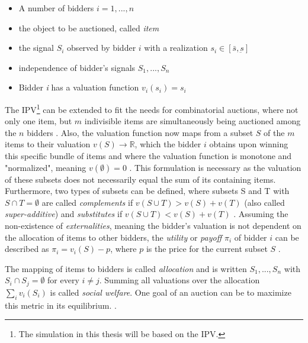 \begin{itemize}
	\item A number of bidders $ i = 1,...,n $
	\item the object to be auctioned, called \textit{item}
	\item the signal $ S_i $ observed by bidder $ i $ with a realization $ s_i \in [\bar{s}, \underbar{s}] $
	\item independence of bidder's signals $ S_1, ..., S_n $
	\item Bidder \textit{i} has a valuation function $ v_i(s_i) = s_i $
\end{itemize}
The IPV\footnote{The simulation in this thesis will be based on the IPV.} can be extended to fit the needs for combinatorial auctions, where not only one item, but $ m $ indivisible items are simultaneously being auctioned among the $ n $ bidders \cite[p. 267]{Nisan2007}. Also, the valuation function now maps from a subset $ S $ of the $ m $ items to their valuation  $ v(S) \to \mathbb{R} $, which the bidder $ i $ obtains upon winning this specific bundle of items and where the valuation function is monotone and "normalized", meaning $ v(\emptyset) = 0 $ \cite[p. 268]{Nisan2007}. 
This formulation is necessary as the valuation of these subsets does not necessarily equal the sum of its containing items. Furthermore, two types of subsets can be defined, where subsets S and T with $ S \cap T = \emptyset $ are called \textit{complements} if $ v(S \cup T) > v(S) + v(T) $ (also called \textit{super-additive}) and \textit{substitutes} if $ v(S \cup T) < v(S) + v(T) $  \cite[p. 268]{Nisan2007}. Assuming the non-existence of \textit{externalities}, meaning the bidder's valuation is not dependent on the allocation of items to other bidders, the \textit{utility} or \textit{payoff} $ \pi_i $ of bidder $ i $ can be described as $ \pi_i = v_i(S) - p $, where $ p $ is the price for the current subset $ S$ \cite[p. 268]{Nisan2007}.

The mapping of items to bidders is called \textit{allocation} and is written $ S_1, ..., S_n $ with $ S_i \cap S_j = \emptyset $ for every $ i \neq j $. Summing all valuations over the allocation  $ \sum_i v_i(S_i) $ is called \textit{social welfare}. One goal of an auction can be to maximize this metric in its equilibrium. \cite[p. 268]{Nisan2007}.

